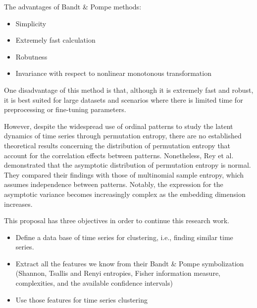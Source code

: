 The advantages of Bandt \& Pompe methods:
\begin{itemize}
	\item Simplicity
	\item Extremely fast calculation
	\item Robutness
	\item Invariance with respect to nonlinear monotonous transformation
\end{itemize}	
	
		
One disadvantage of this method is that, although it is extremely fast and robust, it is best suited for large datasets and scenarios where there is limited time for preprocessing or fine-tuning parameters.

However, despite the widespread use of ordinal patterns to study the latent dynamics of time series through permutation entropy, there are no established theoretical results concerning the distribution of permutation entropy that account for the correlation effects between patterns. Nonetheless, Rey et al. \cite{Rey2023a} demonstrated that the asymptotic distribution of permutation entropy is normal. They compared their findings with those of multinomial sample entropy, which assumes independence between patterns. Notably, the expression for the asymptotic variance becomes increasingly complex as the embedding dimension increases. 

This proposal has three objectives in order to continue this research work.
\begin{itemize}
	\item Define a data base of time series for clustering, i.e., finding similar time series. 
	\item Extract all the features we know from their Bandt \& Pompe symbolization (Shannon, Tsallis and Renyi entropies, Fisher information measure, complexities, and the available confidence intervals)
	\item Use those features for time series clustering 
\end{itemize} 




